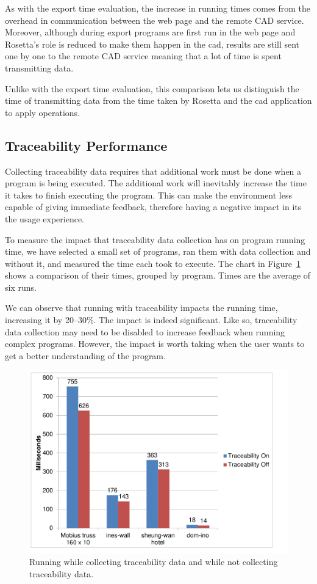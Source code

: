 As with the export time evaluation, the increase in running times comes from the overhead in communication between the web page and the remote CAD service.
Moreover, although during export programs are first run in the web page and Rosetta's role is reduced to make them happen in the \gls{cad}, results are still sent one by one to the remote CAD service meaning that a lot of time is spent transmitting data.

Unlike with the export time evaluation, this comparison lets us distinguish the time of transmitting data from the time taken by Rosetta and the \gls{cad} application to apply operations.


\subsection{Traceability Performance}
Collecting traceability data requires that additional work must be done when a program is being executed.
The additional work will inevitably increase the time it takes to finish executing the program.
This can make the environment less capable of giving immediate feedback, therefore having a negative impact in its the usage experience.

To measure the impact that traceability data collection has on program running time, we have selected a small set of programs, ran them with data collection and without it, and measured the time each took to execute.
The chart in Figure~\ref{fig:traceability:timing} shows a comparison of their times, grouped by program.
Times are the average of six runs.

We can observe that running with traceability impacts the running time, increasing it by 20--30\%.
The impact is indeed significant.
Like so, traceability data collection may need to be disabled to increase feedback when running complex programs.
However, the impact is worth taking when the user wants to get a better understanding of the program.

\begin{figure}
  \centering
  \includegraphics[width=12cm]{./images/traceability_timing}
  \caption{Running while collecting traceability data and while not collecting traceability data.}
  \label{fig:traceability:timing}
\end{figure}




